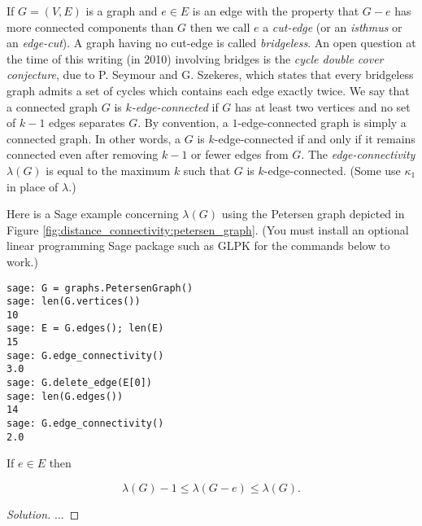 If $G=(V,E)$ is a graph and $e\in E$ is an edge with the property
that $G-e$ has more connected components than $G$ then
we call $e$ a {\it cut-edge} (or an {\it isthmus} or an {\it edge-cut}).
A graph having no cut-edge is called {\it bridgeless}.
An open question at the time of this writing
(in 2010) involving bridges is the
{\it cycle double cover conjecture}, due to P. Seymour and G. Szekeres,
which states that every bridgeless graph admits a set
of cycles which contains each edge exactly twice.
We say that a connected graph $G$ is {\it $k$-edge-connected}
if
$G$ has at least two vertices and no set of $k-1$ edges separates $G$.
By convention, a $1$-edge-connected graph is simply a connected
graph. In other words, a $G$ is $k$-edge-connected if and only if
it remains connected even after removing $k-1$ or fewer edges
from $G$. The {\it edge-connectivity}
$\lambda(G)$ is equal to the maximum $k$ such that
$G$ is $k$-edge-connected. (Some use
$\kappa_1$ in place of $\lambda$.)

Here is a Sage example concerning
$\lambda(G)$ using the Petersen graph
depicted in Figure \ref{fig:distance_connectivity:petersen_graph}.
(You must install an optional linear programming
Sage package such as GLPK for the commands below to work.)

\begin{lstlisting}
sage: G = graphs.PetersenGraph()
sage: len(G.vertices())
10
sage: E = G.edges(); len(E)
15
sage: G.edge_connectivity()
3.0
sage: G.delete_edge(E[0])
sage: len(G.edges())
14
sage: G.edge_connectivity()
2.0
\end{lstlisting}

\begin{lemma}
{\rm
If $e\in E$ then

\[
\lambda(G)-1\leq \lambda(G-e)\leq \lambda(G).
\]
}
\end{lemma}

\begin{proof}[Solution]

...

\end{proof}


